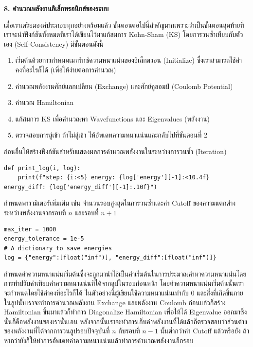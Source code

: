 \vspace{1em}

\noindent \textbf{8. คำนวณพลังงานอิเล็กทรอนิกส์ของระบบ}

เมื่อเราเตรียมองค์ประกอบทุกอย่างพร้อมแล้ว ขั้นตอนต่อไปนี้สำคัญมากเพราะว่าเป็นขั้นตอนสุดท้ายที่เราจะนำฟังก์ชันทั้งหมดที่เราได้เขียนไว้มาแก้สมการ Kohn-Sham (KS) โดยการวนซ้ำเทียบกับตัวเอง (Self-Consistency) มีขั้นตอนดังนี้
%
\begin{enumerate}[topsep=0pt,noitemsep]\setlength\itemsep{0.5em}
    \item เริ่มต้นด้วยการกำหนดเมทริกซ์ความหนาแน่นของอิเล็กตรอน (Initialize) ซึ่งเราสามารถใช้ค่าคงที่อะไรก็ได้ (เพื่อให้ง่ายต่อการคำนวณ)

    \item คำนวณพลังงานศักย์แลกเปลี่ยน (Exchange) และศักย์คูลอมป์ (Coulomb Potential)

    \item คำนวณ Hamiltonian

    \item แก้สมการ KS เพื่อคำนวณหา Wavefunctions และ Eigenvalues (พลังงาน)

    \item ตรวจสอบการลู่เข้า ถ้าไม่ลู่เข้า ให้อัพเดทความหนาแน่นและกลับไปที่ขั้นตอนที่ 2
\end{enumerate}

ก่อนอื่นให้สร้างฟังก์ชันสำหรับแสดงผลการคำนวณพลังงานในระหว่างการวนซ้ำ (Iteration)

\begin{lstlisting}[style=MyPython]
def print_log(i, log):
    print(f"step: {i:<5} energy: {log['energy'][-1]:<10.4f} energy_diff: {log['energy_diff'][-1]:.10f}")
\end{lstlisting}

\vspace{1em}

กำหนดพารามิเตอร์เพิ่มเติม เช่น จำนวนรอบสูงสุดในการวนซ้ำและค่า Cutoff ของความแตกต่างระหว่างพลังงานจากรอบที่ $n$ และรอบที่ $n+1$

\begin{lstlisting}[style=MyPython]
max_iter = 1000
energy_tolerance = 1e-5
# A dictionary to save energies
log = {"energy":[float("inf")], "energy_diff":[float("inf")]}
\end{lstlisting}

\vspace{1em}

กำหนดค่าความหนาแน่นเริ่มต้นซึ่งจะถูกมานำใช้เป็นค่าเริ่มต้นในการประมาณค่าหาความหนาแน่นโดยการทำปรับค่าเทียบค่าความหนาแน่นที่ได้จากลูปในรอบก่อนหน้า โดยค่าความหนาแน่นเริ่มต้นนั้นเราจะกำหนดโดยใช้ค่าคงที่อะไรก็ได้ ในตัวอย่างนี้ผู้เขียนใช้ความหนาแน่นเท่ากับ 0 และสิ่งที่เกิดขึ้นภายในลูปนั้นเราจะทำการคำนวณพลังงาน Exchange และพลังงาน Coulomb ก่อนแล้วก็สร้าง Hamiltonian ขึ้นมาแล้วก็ทำการ Diagonalize Hamiltonian เพื่อให้ได้ Eigenvalue ออกมาซึ่งนั่นก็คือพลังงานของเรานั่นเอน หลังจากนั้นเราจะทำการเก็บค่าพลังงานที่ได้แล้วก็ตรวจสอบว่าส่วนต่างของพลังงานที่ได้จากการวนลูปรอบปัจจุบันที่ $n$ กับรอบที่ $n-1$ นั้นต่ำกว่าค่า Cutoff แล้วหรือยัง ถ้าหากว่ายังก็ให้ทำการอัพเดทค่าความหนาแน่นแล้วทำการคำนวณพลังงานอีกรอบ

